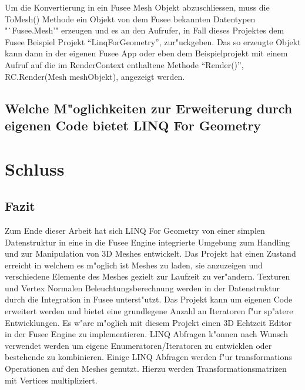 \documentclass[pagesize, paper=a4, fontsize=12pt,titlepage=true, headings=small, headnosepline, abstractoff, liststotoc, nochapterprefix, plainheadsepline]{scrreprt}
\newcommand{\LFG}{LINQ For Geometry}
\newcommand{\LFGS}{LINQ For Geometry }
\begin{document}
Um die Konvertierung in ein Fusee Mesh Objekt abzuschliessen, muss die ToMesh() Methode ein Objekt von dem Fusee bekannten Datentypen "`Fusee.Mesh'" erzeugen und es an den Aufrufer, in Fall dieses Projektes dem Fusee Beispiel Projekt "`LinqForGeometry"', zur"uckgeben. Das so erzeugte Objekt kann dann in der eigenen Fusee App oder eben dem Beispielprojekt mit einem Aufruf auf die im RenderContext enthaltene Methode "`Render()"', RC.Render(Mesh meshObjekt), angezeigt werden.


\section {Welche M"oglichkeiten zur Erweiterung durch eigenen Code bietet \LFG}





\chapter {Schluss}
	\section {Fazit}
		Zum Ende dieser Arbeit hat sich \LFGS von einer simplen Datenstruktur in eine in die Fusee Engine integrierte Umgebung zum Handling und zur Manipulation von 3D Meshes entwickelt. Das Projekt hat einen Zustand erreicht in welchem es m"oglich ist Meshes zu laden, sie anzuzeigen und verschiedene Elemente des Meshes gezielt zur Laufzeit zu ver"andern. Texturen und Vertex Normalen Beleuchtungsberechnung werden in der Datenstruktur durch die Integration in Fusee unterst"utzt. Das Projekt kann um eigenen Code erweitert werden und bietet eine grundlegene Anzahl an Iteratoren f"ur sp"atere Entwicklungen. Es w"are m"oglich mit diesem Projekt einen 3D Echtzeit Editor in der Fusee Engine zu implementieren. LINQ Abfragen k"onnen nach Wunsch verwendet werden um eigene Enumeratoren/Iteratoren zu entwicklen oder bestehende zu kombinieren. Einige LINQ Abfragen werden f"ur transformations Operationen auf den Meshes genutzt. Hierzu werden Transformationsmatrizen mit Vertices multipliziert.
\end{document}
